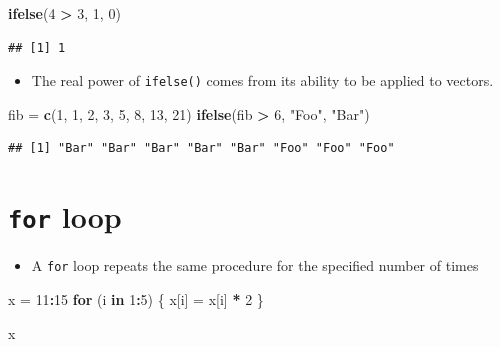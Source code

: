 \documentclass[]{book}
\newenvironment{Shaded}{\begin{snugshade}}{\end{snugshade}}
\newcommand{\KeywordTok}[1]{\textcolor[rgb]{0.13,0.29,0.53}{\textbf{#1}}}
\newcommand{\DecValTok}[1]{\textcolor[rgb]{0.00,0.00,0.81}{#1}}
\newcommand{\StringTok}[1]{\textcolor[rgb]{0.31,0.60,0.02}{#1}}
\newcommand{\ControlFlowTok}[1]{\textcolor[rgb]{0.13,0.29,0.53}{\textbf{#1}}}
\newcommand{\OperatorTok}[1]{\textcolor[rgb]{0.81,0.36,0.00}{\textbf{#1}}}
\newcommand{\NormalTok}[1]{#1}
\providecommand{\tightlist}{%
  \setlength{\itemsep}{0pt}\setlength{\parskip}{0pt}}
\begin{document}
\begin{Shaded}
\begin{Highlighting}[]
\KeywordTok{ifelse}\NormalTok{(}\DecValTok{4} \OperatorTok{>}\StringTok{ }\DecValTok{3}\NormalTok{, }\DecValTok{1}\NormalTok{, }\DecValTok{0}\NormalTok{)}
\end{Highlighting}
\end{Shaded}

\begin{verbatim}
## [1] 1
\end{verbatim}

\begin{itemize}
\tightlist
\item
  The real power of \texttt{ifelse()} comes from its ability to be
  applied to vectors.
\end{itemize}

\begin{Shaded}
\begin{Highlighting}[]
\NormalTok{fib =}\StringTok{ }\KeywordTok{c}\NormalTok{(}\DecValTok{1}\NormalTok{, }\DecValTok{1}\NormalTok{, }\DecValTok{2}\NormalTok{, }\DecValTok{3}\NormalTok{, }\DecValTok{5}\NormalTok{, }\DecValTok{8}\NormalTok{, }\DecValTok{13}\NormalTok{, }\DecValTok{21}\NormalTok{)}
\KeywordTok{ifelse}\NormalTok{(fib }\OperatorTok{>}\StringTok{ }\DecValTok{6}\NormalTok{, }\StringTok{"Foo"}\NormalTok{, }\StringTok{"Bar"}\NormalTok{)}
\end{Highlighting}
\end{Shaded}

\begin{verbatim}
## [1] "Bar" "Bar" "Bar" "Bar" "Bar" "Foo" "Foo" "Foo"
\end{verbatim}

\section{\texorpdfstring{\texttt{for} loop}{for loop}}\label{for-loop}

\begin{itemize}
\tightlist
\item
  A \texttt{for} loop repeats the same procedure for the specified
  number of times
\end{itemize}

\begin{Shaded}
\begin{Highlighting}[]
\NormalTok{x =}\StringTok{ }\DecValTok{11}\OperatorTok{:}\DecValTok{15}
\ControlFlowTok{for}\NormalTok{ (i }\ControlFlowTok{in} \DecValTok{1}\OperatorTok{:}\DecValTok{5}\NormalTok{) \{}
\NormalTok{  x[i] =}\StringTok{ }\NormalTok{x[i] }\OperatorTok{*}\StringTok{ }\DecValTok{2}
\NormalTok{\}}

\NormalTok{x}
\end{Highlighting}
\end{Shaded}
\end{document}
